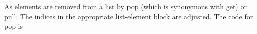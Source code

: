 As elements are removed from a list by pop (which is synonymous with
get) or pull. The indices in the appropriate list-element block are
adjusted. The code for pop is

